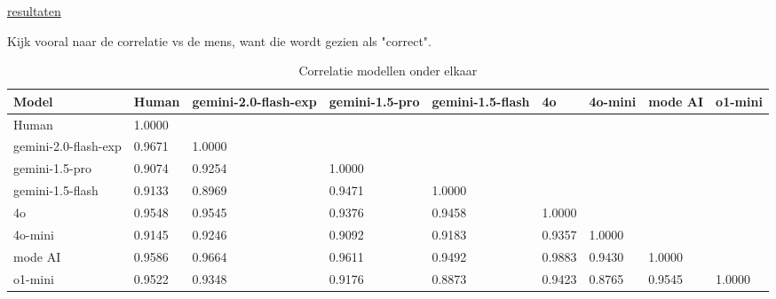 \documentclass[12pt]{article}
\begin{document}
\href{https://docs.google.com/spreadsheets/d/10NNihuDYj4w9L_6Zt7fzNZCPK-7qFkCTgRn8BRHSbsM}{resultaten}


\noindent\begin{table}[H]
\caption{Correlatie modellen onder elkaar}
\label{fig:correlatie-model}
Kijk vooral naar de correlatie vs de mens, want die wordt gezien als "correct".

\begin{tabularx}{\textwidth}{p{4cm} XXXXXXXX}
    \toprule
    \textbf{Model} & \textbf{Human} & \textbf{gemini-2.0-flash-exp} & \textbf{gemini-1.5-pro} & \textbf{gemini-1.5-flash} & \textbf{4o} & \textbf{4o-mini} & \textbf{mode AI} & \textbf{o1-mini} \\
    \midrule
    Human & \cellcolor[rgb]{0.275,0.514,0.275}1.0000 &  &  &  &  &  &  &  \\
    gemini-2.0-flash-exp & \cellcolor[rgb]{0.468,0.644,0.468}0.9671 & \cellcolor[rgb]{0.275,0.514,0.275}1.0000 &  &  &  &  &  &  \\
    gemini-1.5-pro & \cellcolor[rgb]{0.818,0.878,0.818}0.9074 & \cellcolor[rgb]{0.713,0.807,0.713}0.9254 & \cellcolor[rgb]{0.275,0.514,0.275}1.0000 &  &  &  &  &  \\
    gemini-1.5-flash & \cellcolor[rgb]{0.784,0.855,0.784}0.9133 & \cellcolor[rgb]{0.880,0.920,0.880}0.8969 & \cellcolor[rgb]{0.586,0.722,0.586}0.9471 & \cellcolor[rgb]{0.275,0.514,0.275}1.0000 &  &  &  &  \\
    4o & \cellcolor[rgb]{0.541,0.692,0.541}0.9548 & \cellcolor[rgb]{0.542,0.693,0.542}0.9545 & \cellcolor[rgb]{0.641,0.760,0.641}0.9376 & \cellcolor[rgb]{0.593,0.727,0.593}0.9458 & \cellcolor[rgb]{0.275,0.514,0.275}1.0000 &  &  &  \\
    4o-mini & \cellcolor[rgb]{0.777,0.850,0.777}0.9145 & \cellcolor[rgb]{0.718,0.811,0.718}0.9246 & \cellcolor[rgb]{0.808,0.871,0.808}0.9092 & \cellcolor[rgb]{0.755,0.836,0.755}0.9183 & \cellcolor[rgb]{0.653,0.767,0.653}0.9357 & \cellcolor[rgb]{0.275,0.514,0.275}1.0000 &  &  \\
    mode AI & \cellcolor[rgb]{0.518,0.677,0.518}0.9586 & \cellcolor[rgb]{0.473,0.646,0.473}0.9664 & \cellcolor[rgb]{0.504,0.667,0.504}0.9611 & \cellcolor[rgb]{0.573,0.714,0.573}0.9492 & \cellcolor[rgb]{0.344,0.560,0.344}0.9883 & \cellcolor[rgb]{0.610,0.738,0.610}0.9430 & \cellcolor[rgb]{0.275,0.514,0.275}1.0000 &  \\
    o1-mini & \cellcolor[rgb]{0.556,0.702,0.556}0.9522 & \cellcolor[rgb]{0.658,0.771,0.658}0.9348 & \cellcolor[rgb]{0.759,0.838,0.759}0.9176 & \cellcolor[rgb]{0.937,0.958,0.937}0.8873 & \cellcolor[rgb]{0.614,0.741,0.614}0.9423 & \cellcolor[rgb]{1.000,1.000,1.000}0.8765 & \cellcolor[rgb]{0.542,0.693,0.542}0.9545 & \cellcolor[rgb]{0.275,0.514,0.275}1.0000 \\
    \bottomrule
\end{tabularx}
\end{table}
\end{document}
